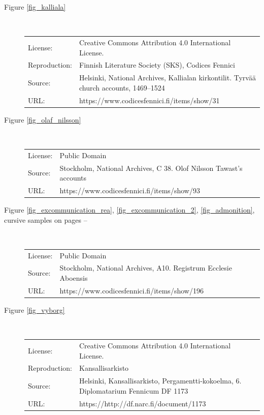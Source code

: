 \documentclass[a4paper]{article}
\begin{document}
\begin{description}
  \item [Figure \ref{fig_kalliala}]  \mbox{} \\

\begin{tabular}{p{2cm}p{10cm}}
      
      License: &  Creative Commons Attribution 4.0 International
      License.  \\
      Reproduction: & Finnish Literature Society (SKS), Codices
      Fennici \\
      Source: & Helsinki, National Archives, Kallialan kirkontilit. Tyrvää church accounts, 1469–1524 \\
      URL: & https://www.codicesfennici.fi/items/show/31
    \end{tabular}

  \item [Figure \ref{fig_olaf_nilsson} ] \mbox{} \\
    
    \begin{tabular}{p{2cm}p{10cm}}
      License: & Public Domain \\
      Source: & Stockholm, National Archives, C 38. Olof Nilsson Tawast’s accounts \\
      URL: & https://www.codicesfennici.fi/items/show/93
    \end{tabular}




  \item [Figure \ref{fig_excommunication_rea},
    \ref{fig_excommunication_2}, \ref{fig_admonition}, cursive samples
    on pages
    \pageref{cursive_start}–\pageref{cursive_end}]  \mbox{} \\
    
    \begin{tabular}{p{2cm}p{10cm}}
      
      License: & Public Domain \\
      Source: & Stockholm, National Archives, A10. Registrum Ecclesie
      Aboensis \\
      URL: & https://www.codicesfennici.fi/items/show/196 
    \end{tabular}
      
  \item [Figure \ref{fig_vyborg}]    \mbox{} \\

    \begin{tabular}{p{2cm}p{10cm}}
      
      License: &  Creative Commons Attribution 4.0 International
      License.  \\
      Reproduction: & Kansallisarkisto \\
      Source: &  Helsinki, Kansallisarkisto, Pergamentti-kokoelma, 6. Diplomatarium Fennicum DF 1173 \\
      URL: & https://http://df.narc.fi/document/1173
    \end{tabular}
    

\end{description}
\end{document}
